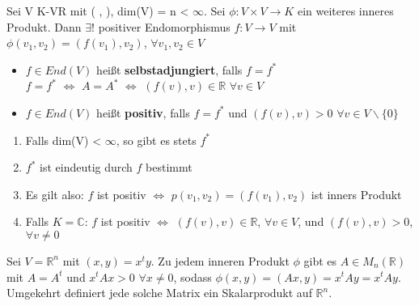 \begin{theorem}
Sei V K-VR mit ( , ), dim(V) = n < $\infty$. Sei $\phi: V \times V \to K$ ein weiteres inneres Produkt. Dann $\exists !$ positiver Endomorphismus $f: V \to V$ mit $\phi(v_1, v_2) = (f(v_1), v_2)$, $\forall v_1, v_2 \in V$
\end{theorem}
\begin{definition}
\leavevmode
\begin{itemize}
\item $f \in End(V)$ heißt \textbf{selbstadjungiert}, falls $f = f^*$\\
$f = f^*$ $\Leftrightarrow$ $A = A^*$ $\Leftrightarrow$ $(f(v), v) \in \mathbb{R}$ $\forall v \in V$
\item $f \in End(V)$ heißt \textbf{positiv}, falls $f= f^*$ und $(f(v), v) > 0$ $\forall v \in V \backslash \{0\}$
\end{itemize}
\end{definition}
\begin{remark}
\leavevmode
\begin{enumerate}
\item Falls dim(V) < $\infty$, so gibt es stets $f^*$
\item $f^*$ ist eindeutig durch $f$ bestimmt
\item Es gilt also: $f$ ist positiv $\Leftrightarrow$ $p(v_1, v_2) = (f(v_1), v_2)$ ist inners Produkt
\item Falls $K = \mathbb{C}$: $f$ ist positiv $\Leftrightarrow$ $(f(v), v) \in \mathbb{R}$, $\forall v \in V$, und $(f(v), v) > 0$, $\forall v \neq 0$
\end{enumerate}
\end{remark}
\begin{remark}
Sei $V = \mathbb{R}^n$ mit $(x, y) = x^ty$. Zu jedem inneren Produkt $\phi$ gibt es $A \in M_n(\mathbb{R})$ mit $A = A^t$ und $x^tAx > 0$ $\forall x \neq 0$, sodass $\phi (x, y) = (Ax, y) = x^tAy = x^tAy$.\\
Umgekehrt definiert jede solche Matrix ein Skalarprodukt auf $\mathbb{R}^n$.
\end{remark}

